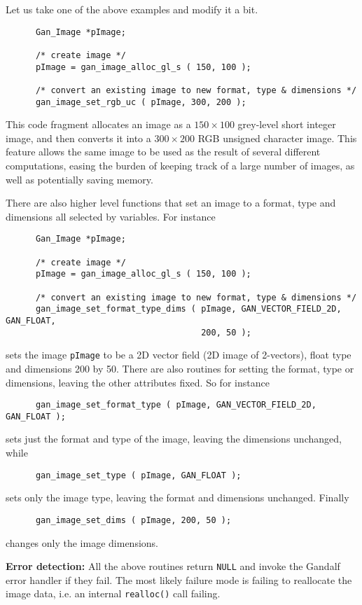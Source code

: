 Let us take one of the above examples and modify it a bit.
\begin{verbatim}
      Gan_Image *pImage;

      /* create image */
      pImage = gan_image_alloc_gl_s ( 150, 100 );

      /* convert an existing image to new format, type & dimensions */
      gan_image_set_rgb_uc ( pImage, 300, 200 );
\end{verbatim}
This code fragment allocates an image as a $150\times 100$ grey-level short
integer image, and then converts it into a $300\times 200$ RGB unsigned
character image. This feature allows the same image to be used as the
result of several different computations, easing the burden of keeping
track of a large number of images, as well as potentially saving memory.

There are also higher level functions that set an image to a format,
type and dimensions all selected by variables. For instance
\begin{verbatim}
      Gan_Image *pImage;

      /* create image */
      pImage = gan_image_alloc_gl_s ( 150, 100 );

      /* convert an existing image to new format, type & dimensions */
      gan_image_set_format_type_dims ( pImage, GAN_VECTOR_FIELD_2D, GAN_FLOAT,
                                       200, 50 );
\end{verbatim}
sets the image {\tt pImage} to be a 2D vector field (2D image of 2-vectors),
float type and dimensions 200 by 50. There are also routines for setting
the format, type or dimensions, leaving the other attributes fixed.
So for instance
\begin{verbatim}
      gan_image_set_format_type ( pImage, GAN_VECTOR_FIELD_2D, GAN_FLOAT );
\end{verbatim}
sets just the format and type of the image, leaving the dimensions unchanged,
while
\begin{verbatim}
      gan_image_set_type ( pImage, GAN_FLOAT );
\end{verbatim}
sets only the image type, leaving the format and dimensions unchanged.
Finally
\begin{verbatim}
      gan_image_set_dims ( pImage, 200, 50 );
\end{verbatim}
changes only the image dimensions.

{\bf Error detection:} All the above routines return {\tt NULL} and invoke the
Gandalf error handler if they fail. The most likely failure mode is failing
to reallocate the image data, i.e. an internal {\tt realloc()} call failing.

